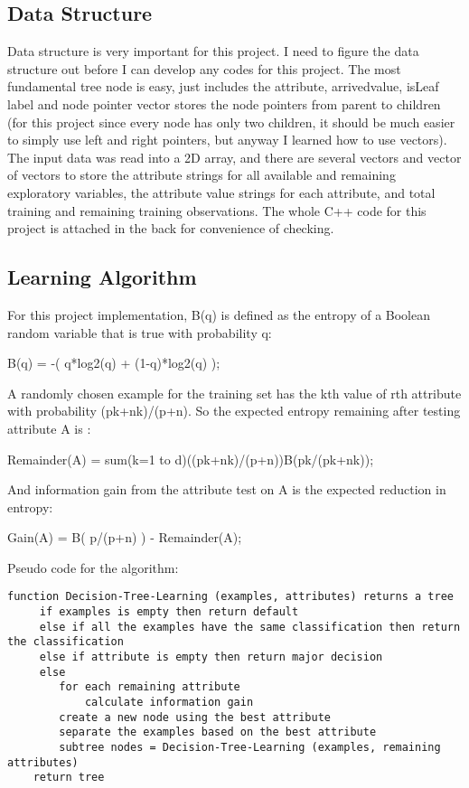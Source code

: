\documentclass[12pt]{book}
\begin{document}
\subsection{Data Structure}
\label{sec-4-10-2}

Data structure is very important for this project. I need to figure the data structure out before I can develop any codes for this project. The most fundamental tree node is easy, just includes the attribute, arrived\textunderscore value, isLeaf label and node pointer vector stores the node pointers from parent to children (for this project since every node has only two children, it should be much easier to simply use left and right pointers, but anyway I learned how to use vectors). The input data was read into a 2D array, and there are several vectors and vector of vectors to store the attribute strings for all available and remaining exploratory variables, the attribute value strings for each attribute, and total training and remaining training observations. The whole C++ code for this project is attached in the back for convenience of checking. 

\subsection{Learning Algorithm}
\label{sec-4-10-3}

For this project implementation, B(q) is defined as the entropy of a Boolean random variable that is true with probability q:

B(q) = -( q*log2(q) + (1-q)*log2(q) );

A randomly chosen example for the training set has the kth value of rth attribute with probability (pk+nk)/(p+n). So the expected entropy remaining after testing attribute A is : 

Remainder(A) = sum(k=1 to d)((pk+nk)/(p+n))B(pk/(pk+nk));

And information gain from the attribute test on A is the expected reduction in entropy: 

Gain(A) = B( p/(p+n) ) - Remainder(A);

Pseudo code for the algorithm: 
\lstset{language=java,label= ,caption= ,numbers=none}
\begin{lstlisting}
function Decision-Tree-Learning (examples, attributes) returns a tree
	 if examples is empty then return default
	 else if all the examples have the same classification then return the classification
	 else if attribute is empty then return major decision
	 else
		for each remaining attribute
		    calculate information gain
		create a new node using the best attribute
		separate the examples based on the best attribute
		subtree nodes = Decision-Tree-Learning (examples, remaining attributes)
	return tree
\end{lstlisting}
\end{document}
